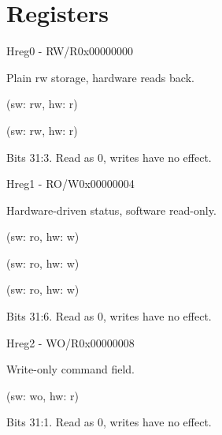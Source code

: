 \documentclass{article}
\begin{document}
\section{Registers}

\begin{register}{H}{reg0 - RW/R}{0x00000000}  \par Plain rw storage, hardware reads back. \regnewline
  \label{reg0}
\regnewline
  \begin{regdesc}\begin{reglist}[field0]
    \item [field0] (sw: rw, hw: r)
    \item [field1] (sw: rw, hw: r)
    \item [reserved] Bits 31:3. Read as 0, writes have no effect.
  \end{reglist}\end{regdesc}
\end{register}

\begin{register}{H}{reg1 - RO/W}{0x00000004}  \par Hardware-driven status, software read-only. \regnewline
  \label{reg1}
\regnewline
  \begin{regdesc}\begin{reglist}[field0]
    \item [field0] (sw: ro, hw: w)
    \item [field1] (sw: ro, hw: w)
    \item [field2] (sw: ro, hw: w)
    \item [reserved] Bits 31:6. Read as 0, writes have no effect.
  \end{reglist}\end{regdesc}
\end{register}

\begin{register}{H}{reg2 - WO/R}{0x00000008}  \par Write-only command field. \regnewline
  \label{reg2}
\regnewline
  \begin{regdesc}\begin{reglist}[field0]
    \item [field0] (sw: wo, hw: r)
    \item [reserved] Bits 31:1. Read as 0, writes have no effect.
  \end{reglist}\end{regdesc}
\end{register}
\end{document}
